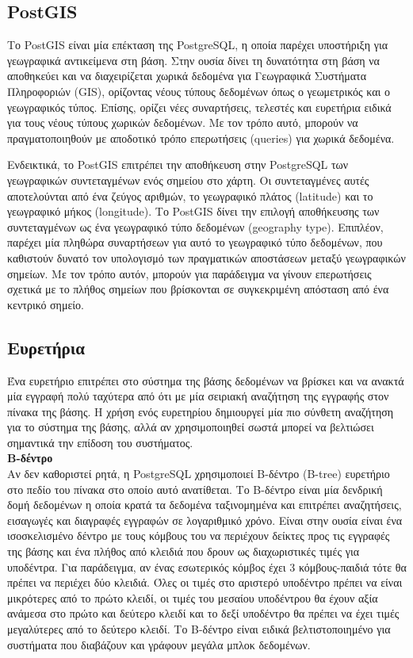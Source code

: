 \documentclass[diploma]{softlab-thesis}
\begin{document}
\subsection{PostGIS}

Το PostGIS είναι μία επέκταση της PostgreSQL, η οποία παρέχει υποστήριξη για γεωγραφικά αντικείμενα στη βάση. Στην ουσία δίνει τη δυνατότητα στη βάση να αποθηκεύει 
και να διαχειρίζεται χωρικά δεδομένα για Γεωγραφικά Συστήματα Πληροφοριών (GIS), ορίζοντας νέους τύπους δεδομένων όπως ο γεωμετρικός και ο γεωγραφικός τύπος. 
Επίσης, ορίζει νέες συναρτήσεις, τελεστές και ευρετήρια ειδικά για τους νέους τύπους χωρικών δεδομένων. Με τον τρόπο αυτό, μπορούν να πραγματοποιηθούν 
με αποδοτικό τρόπο επερωτήσεις (queries) για χωρικά δεδομένα. 

Ενδεικτικά, το PostGIS επιτρέπει την αποθήκευση στην PostgreSQL των γεωγραφικών συντεταγμένων ενός σημείου στο χάρτη. Οι συντεταγμένες αυτές αποτελούνται από ένα 
ζεύγος αριθμών, το γεωγραφικό πλάτος (latitude) και το γεωγραφικό μήκος (longitude). Το PostGIS δίνει την επιλογή αποθήκευσης των συντεταγμένων ως ένα γεωγραφικό 
τύπο δεδομένων (geography type). Επιπλέον, παρέχει μία πληθώρα συναρτήσεων για αυτό το γεωγραφικό τύπο δεδομένων, που καθιστούν δυνατό τον υπολογισμό των πραγματικών 
αποστάσεων μεταξύ γεωγραφικών σημείων. Με τον τρόπο αυτόν, μπορούν για παράδειγμα να γίνουν επερωτήσεις σχετικά με το πλήθος σημείων που βρίσκονται σε συγκεκριμένη 
απόσταση από ένα κεντρικό σημείο.

\subsection{Ευρετήρια}

Ένα ευρετήριο επιτρέπει στο σύστημα της βάσης δεδομένων να βρίσκει και να ανακτά μία εγγραφή πολύ ταχύτερα από ότι με μία σειριακή αναζήτηση της εγγραφής στον πίνακα 
της βάσης. Η χρήση ενός ευρετηρίου δημιουργεί μία πιο σύνθετη αναζήτηση για το σύστημα της βάσης, αλλά αν χρησιμοποιηθεί σωστά μπορεί να βελτιώσει σημαντικά την επίδοση του 
συστήματος. \\

\textbf{Β-δέντρο}\\

Αν δεν καθοριστεί ρητά, η PostgreSQL χρησιμοποιεί B-δέντρο (B-tree) ευρετήριο στο πεδίο του πίνακα στο οποίο αυτό ανατίθεται. Το Β-δέντρο είναι μία δενδρική δομή δεδομένων η οποία 
κρατά τα δεδομένα ταξινομημένα και επιτρέπει αναζητήσεις, εισαγωγές και διαγραφές εγγραφών σε λογαριθμικό χρόνο. Είναι στην ουσία είναι ένα ισοσκελισμένο δέντρο με τους 
κόμβους του να περιέχουν δείκτες προς τις εγγραφές της βάσης και ένα πλήθος από κλειδιά που δρουν ως διαχωριστικές τιμές για υποδέντρα. Για παράδειγμα, αν ένας 
εσωτερικός κόμβος έχει 3 κόμβους-παιδιά τότε θα πρέπει να περιέχει δύο κλειδιά. Όλες οι τιμές στο αριστερό υποδέντρο πρέπει να είναι μικρότερες από το πρώτο κλειδί, 
οι τιμές του μεσαίου υποδέντρου θα έχουν αξία ανάμεσα στο πρώτο και δεύτερο κλειδί και το δεξί υποδέντρο θα πρέπει να έχει τιμές μεγαλύτερες από το δεύτερο κλειδί. 
Το Β-δέντρο είναι ειδικά βελτιστοποιημένο για συστήματα που διαβάζουν και γράφουν μεγάλα μπλοκ δεδομένων.\\
\end{document}
